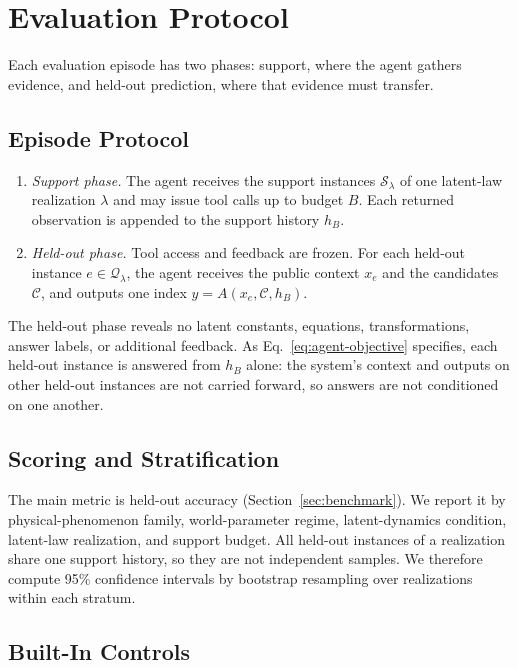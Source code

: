 \section{Evaluation Protocol}
\label{sec:protocol}

Each evaluation episode has two phases: support, where the agent gathers evidence, and held-out prediction, where that evidence must transfer.

\subsection{Episode Protocol}

\begin{enumerate}
  \item \emph{Support phase.} The agent receives the support instances $\mathcal{S}_\lambda$ of one latent-law realization $\lambda$ and may issue tool calls up to budget $B$. Each returned observation is appended to the support history $h_B$.
  \item \emph{Held-out phase.} Tool access and feedback are frozen. For each held-out instance $e\in\mathcal{Q}_\lambda$, the agent receives the public context $x_e$ and the candidates $\mathcal{C}$, and outputs one index $\hat y=A(x_e,\mathcal{C},h_B)$.
\end{enumerate}

The held-out phase reveals no latent constants, equations, transformations, answer labels, or additional feedback. As Eq.~\eqref{eq:agent-objective} specifies, each held-out instance is answered from $h_B$ alone: the system's context and outputs on other held-out instances are not carried forward, so answers are not conditioned on one another.

\subsection{Scoring and Stratification}

The main metric is held-out accuracy (Section~\ref{sec:benchmark}). We report it by physical-phenomenon family, world-parameter regime, latent-dynamics condition, latent-law realization, and support budget. All held-out instances of a realization share one support history, so they are not independent samples. We therefore compute 95\% confidence intervals by bootstrap resampling over realizations within each stratum. 

\subsection{Built-In Controls}
\label{sec:protocol:ablations}

